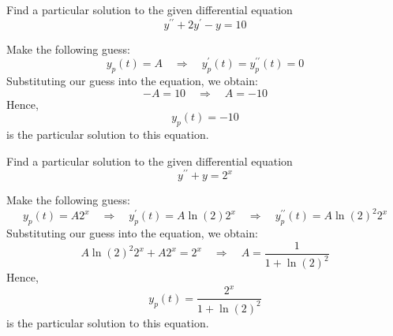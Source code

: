 \documentclass[11pt]{article}
\begin{document}
\begin{preamble}
\begin{formulaitem}
\end{formulaitem}
\end{preamble}



\begin{problem}
Find a particular solution to the given differential equation
\begin{equation*}
y^{\prime \prime} +2 y^{\prime} - y =10
\end{equation*}
\end{problem}
\begin{solution}
Make the following guess:
\begin{equation*}
y_{p}(t) = A \quad \Rightarrow \quad y_{p}^{\prime}(t) = y_{p}^{\prime \prime}(t) = 0
\end{equation*}
Substituting our guess into the equation, we obtain:
\begin{equation*}
-A =10 \quad \Rightarrow \quad A = -10
\end{equation*}
Hence, $$\boxed{y_{p}(t) = -10}$$ is the particular solution to this equation.
\end{solution}


\begin{problem}
Find a particular solution to the given differential equation
\begin{equation*}
y^{\prime \prime} +  y = 2^{x}
\end{equation*}
\end{problem}
\begin{solution}
Make the following guess:
\begin{equation*}
y_{p}(t) = A 2^{x} \quad \Rightarrow \quad y_{p}^{\prime}(t) =A \ln(2) 2^{x} \quad \Rightarrow \quad y_{p}^{\prime \prime}(t) = A \ln(2)^{2} 2^{x}
\end{equation*}
Substituting our guess into the equation, we obtain:
\begin{equation*}
A \ln(2)^{2} 2^{x} + A 2^{x} = 2^x \quad \Rightarrow \quad A = \dfrac{1}{1 + \ln(2)^2}
\end{equation*}
Hence, $$\boxed{y_{p}(t) = \dfrac{2^x}{1 + \ln(2)^2}}$$ is the particular solution to this equation.
\end{solution}
\end{document}
